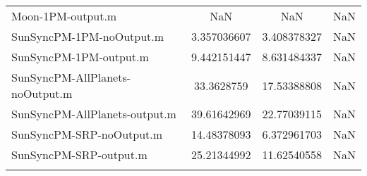 \begin{table}[htbp!]
\begin{tabular}{lccc}
         Moon-1PM-output.m & NaN & NaN & NaN \\
         SunSyncPM-1PM-noOutput.m & 3.357036607 & 3.408378327 & NaN \\
         SunSyncPM-1PM-output.m & 9.442151447 & 8.631484337 & NaN \\
         SunSyncPM-AllPlanets-noOutput.m & 33.3628759 & 17.53388808 & NaN \\
         SunSyncPM-AllPlanets-output.m & 39.61642969 & 22.77039115 & NaN \\
         SunSyncPM-SRP-noOutput.m & 14.48378093 & 6.372961703 & NaN \\
         SunSyncPM-SRP-output.m & 25.21344992 & 11.62540558 & NaN \\
      \hline\hline
      \label{Table: Performance1-2} 
\end{tabular}
\end{table}
